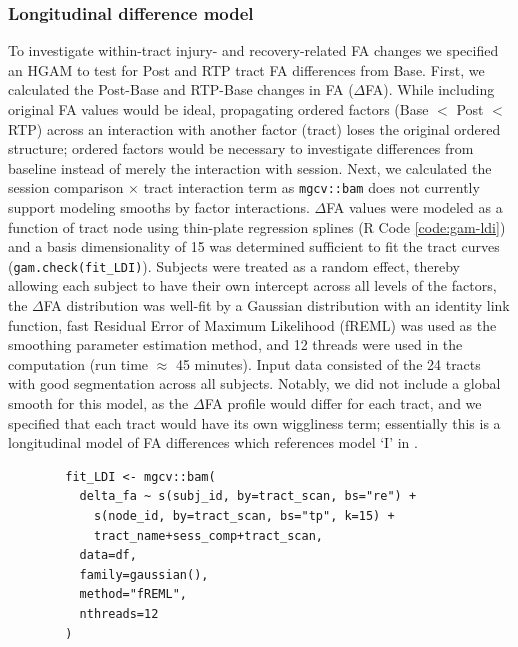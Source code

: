 \documentclass[12pt]{article}
\begin{document}
\subsubsection{Longitudinal difference model}
\label{sssec:meth-gam-ldi}
To investigate within-tract injury- and recovery-related FA changes we specified an HGAM to test for Post and RTP tract FA differences from Base. First, we calculated the Post-Base and RTP-Base changes in FA ($\Delta$FA). While including original FA values would be ideal, propagating ordered factors (Base $<$ Post $<$ RTP) across an interaction with another factor (tract) loses the original ordered structure; ordered factors would be necessary to investigate differences from baseline instead of merely the interaction with session. Next, we calculated the session comparison $\times$ tract interaction term as \lstinline{mgcv::bam} does not currently support modeling smooths by factor interactions. $\Delta$FA values were modeled as a function of tract node using thin-plate regression splines (R Code \ref{code:gam-ldi}) and a basis dimensionality of 15 was determined sufficient to fit the tract curves (\lstinline{gam.check(fit_LDI)}). Subjects were treated as a random effect, thereby allowing each subject to have their own intercept across all levels of the factors, the $\Delta$FA distribution was well-fit by a Gaussian distribution with an identity link function, fast Residual Error of Maximum Likelihood (fREML) was used as the smoothing parameter estimation method, and 12 threads were used in the computation (run time $\approx$ 45 minutes). Input data consisted of the 24 tracts with good segmentation across all subjects. Notably, we did not include a global smooth for this model, as the $\Delta$FA profile would differ for each tract, and we specified that each tract would have its own wiggliness term; essentially this is a longitudinal model of FA differences which references model `I' in \textcite{pedersen2019HierarchicalGeneralizedAdditive}.

\begin{equ}[H]
	\begin{lstlisting}
		fit_LDI <- mgcv::bam(
		  delta_fa ~ s(subj_id, by=tract_scan, bs="re") +
		    s(node_id, by=tract_scan, bs="tp", k=15) +
		    tract_name+sess_comp+tract_scan,
		  data=df,
		  family=gaussian(),
		  method="fREML",
		  nthreads=12
		)
	\end{lstlisting}
	\caption{$\Delta$FA values are modeled as a function of tract node with thin-plate regression smooths for each tract, accounting for the within-subject factors of tract and session and using separate wiggliness terms for each tract. \lstinline{delta_fa} = RTP-Base and Post-Base FA differences, \lstinline{subj_id} = subject identifier factor, \lstinline{node_id} = node identifier integer, \lstinline{tract_name} = tract identifier factor, \lstinline{sess_comp} = session comparison factor (RTP-Base, Post-Base), and \lstinline{tract_scan} = interaction of \lstinline{tract_name} and \lstinline{sess_comp}.}
	\label{code:gam-ldi}
\end{equ}
\end{document}
